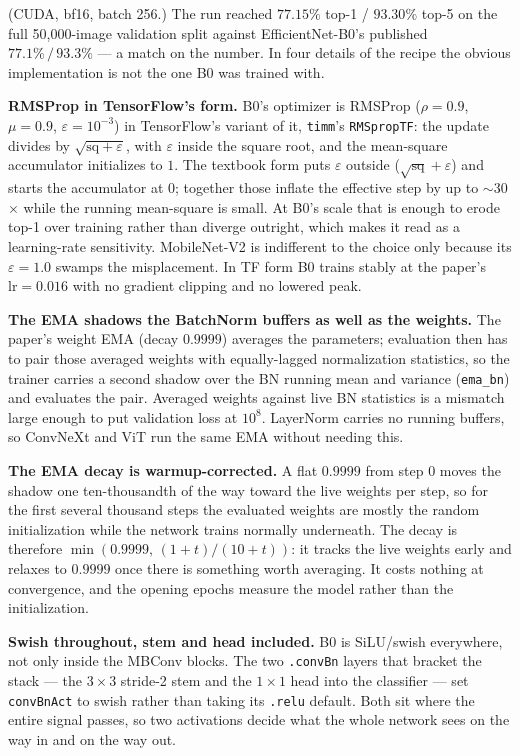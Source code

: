 \noindent (CUDA, bf16, batch 256.) The run reached
$\mathbf{77.15\%}$ top-1 / $\mathbf{93.30\%}$ top-5 on the full
50{,}000-image validation split against EfficientNet-B0's published
$77.1\%\,/\,93.3\%$ --- a match on the number. In four details of the
recipe the obvious implementation is not the one B0 was trained with.

\textbf{RMSProp in TensorFlow's form.} B0's optimizer is RMSProp
($\rho=0.9$, $\mu=0.9$, $\varepsilon=10^{-3}$) in TensorFlow's variant of
it, \texttt{timm}'s \texttt{RMSpropTF}: the update divides by
$\sqrt{\mathrm{sq}+\varepsilon}$, with $\varepsilon$ inside the
square root, and the mean-square accumulator initializes to $1$. The
textbook form puts $\varepsilon$ outside
($\sqrt{\mathrm{sq}}+\varepsilon$) and starts the accumulator at $0$;
together those inflate the effective step by up to $\sim$30$\times$ while
the running mean-square is small. At B0's scale that is enough to erode
top-1 over training rather than diverge outright, which makes it read as
a learning-rate sensitivity. MobileNet-V2 is indifferent to the choice
only because its $\varepsilon=1.0$ swamps the misplacement. In TF form B0
trains stably at the paper's $\mathrm{lr}=0.016$ with no gradient
clipping and no lowered peak.

\textbf{The EMA shadows the BatchNorm buffers as well as the weights.}
The paper's weight EMA (decay $0.9999$) averages the parameters;
evaluation then has to pair those averaged weights with equally-lagged
normalization statistics, so the trainer carries a second shadow over the
BN running mean and variance (\texttt{ema\_bn}) and evaluates the pair.
Averaged weights against live BN statistics is a mismatch large enough to
put validation loss at $10^{8}$. LayerNorm carries no running buffers, so
ConvNeXt and ViT run the same EMA without needing this.

\textbf{The EMA decay is warmup-corrected.} A flat $0.9999$ from step $0$
moves the shadow one ten-thousandth of the way toward the live weights
per step, so for the first several thousand steps the evaluated
weights are mostly the random initialization while the network trains
normally underneath. The decay is therefore
$\min(0.9999,\,(1+t)/(10+t))$: it tracks the live weights early and
relaxes to $0.9999$ once there is something worth averaging. It costs
nothing at convergence, and the opening epochs measure the model rather
than the initialization.

\textbf{Swish throughout, stem and head included.} B0 is SiLU/swish
everywhere, not only inside the MBConv blocks. The two \texttt{.convBn}
layers that bracket the stack --- the $3\times3$ stride-2 stem and the
$1\times1$ head into the classifier --- set \texttt{convBnAct} to swish
rather than taking its \texttt{.relu} default. Both sit where the entire
signal passes, so two activations decide what the whole network sees on
the way in and on the way out.

